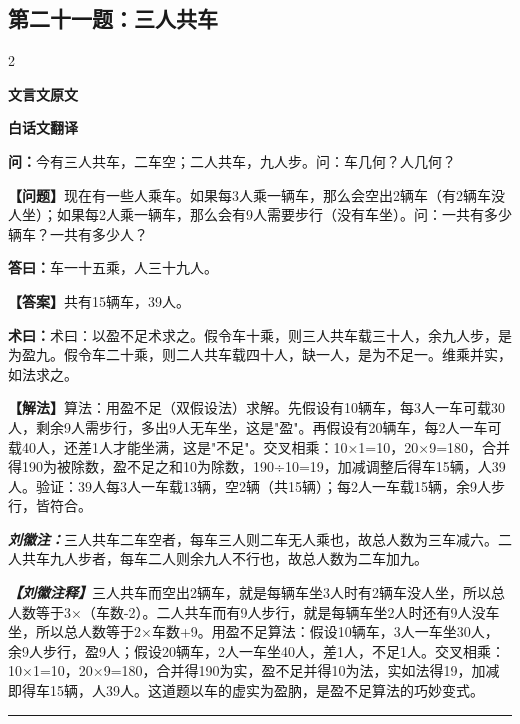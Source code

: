\documentclass[10pt,a4paper]{article}
\newcommand{\wen}[1]{\textbf{\color{problemcolor}问：}#1\par}
\newcommand{\da}[1]{\textbf{答曰：}#1\par}
\newcommand{\shu}[1]{\textbf{术曰：}#1\par}
\newcommand{\liuhui}[1]{{\color{commentarycolor}\textit{\textbf{刘徽注：}}#1\par}}
\newcommand{\classicalheader}[1]{{\centering\large\bfseries\color{classicalcolor} #1\par\vspace{0.5em}}}
\newcommand{\wenmodern}[1]{\textbf{\color{moderncolor}【问题】}#1\par}
\newcommand{\damodern}[1]{\textbf{【答案】}#1\par}
\newcommand{\shumodern}[1]{\textbf{【解法】}#1\par}
\newcommand{\liuhuimodern}[1]{{\color{commentarycolor}\textit{\textbf{【刘徽注释】}}#1\par}}
\newcommand{\modernheader}[1]{{\centering\large\bfseries\color{moderncolor} #1\par\vspace{0.5em}}}
\newcommand{\problemsec}[1]{\subsection*{#1}}
\begin{document}
\problemsec{第二十一题：三人共车}
\begin{paracol}{2}
\classicalheader{文言文原文}
\switchcolumn
\modernheader{白话文翻译}
\switchcolumn*

\wen{今有三人共车，二车空；二人共车，九人步。问：车几何？人几何？}

\switchcolumn

\wenmodern{现在有一些人乘车。如果每3人乘一辆车，那么会空出2辆车（有2辆车没人坐）；如果每2人乘一辆车，那么会有9人需要步行（没有车坐）。问：一共有多少辆车？一共有多少人？}

\switchcolumn*

\da{车一十五乘，人三十九人。}

\switchcolumn

\damodern{共有15辆车，39人。}

\switchcolumn*

\shu{术曰：以盈不足术求之。假令车十乘，则三人共车载三十人，余九人步，是为盈九。假令车二十乘，则二人共车载四十人，缺一人，是为不足一。维乘并实，如法求之。}

\switchcolumn

\shumodern{算法：用盈不足（双假设法）求解。先假设有10辆车，每3人一车可载30人，剩余9人需步行，多出9人无车坐，这是"盈"。再假设有20辆车，每2人一车可载40人，还差1人才能坐满，这是"不足"。交叉相乘：10×1=10，20×9=180，合并得190为被除数，盈不足之和10为除数，190÷10=19，加减调整后得车15辆，人39人。验证：39人每3人一车载13辆，空2辆（共15辆）；每2人一车载15辆，余9人步行，皆符合。}

\switchcolumn*

\liuhui{三人共车二车空者，每车三人则二车无人乘也，故总人数为三车减六。二人共车九人步者，每车二人则余九人不行也，故总人数为二车加九。}

\switchcolumn

\liuhuimodern{三人共车而空出2辆车，就是每辆车坐3人时有2辆车没人坐，所以总人数等于3×（车数-2）。二人共车而有9人步行，就是每辆车坐2人时还有9人没车坐，所以总人数等于2×车数+9。用盈不足算法：假设10辆车，3人一车坐30人，余9人步行，盈9人；假设20辆车，2人一车坐40人，差1人，不足1人。交叉相乘：10×1=10，20×9=180，合并得190为实，盈不足并得10为法，实如法得19，加减即得车15辆，人39人。这道题以车的虚实为盈肭，是盈不足算法的巧妙变式。}

\end{paracol}

\vspace{0.3cm}
\hrule
\vspace{0.3cm}
\end{document}
